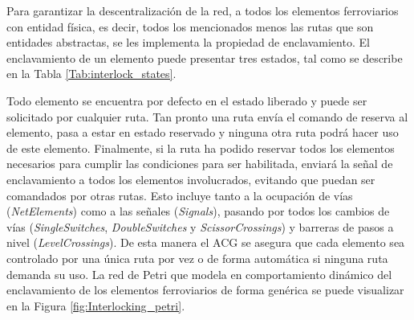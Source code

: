 Para garantizar la descentralización de la red, a todos los elementos ferroviarios con entidad física, es decir, todos los mencionados menos las rutas que son entidades abstractas, se les implementa la propiedad de enclavamiento. El enclavamiento de un elemento puede presentar tres estados, tal como se describe en la Tabla \ref{Tab:interlock_states}.

	\begin{table}[!h]
	{
		\caption{Estados de enclavamiento de cada elemento ferroviario.}
		\label{Tab:interlock_states}
		\centering
	}
	\end{table}

Todo elemento se encuentra por defecto en el estado liberado y puede ser solicitado por cualquier ruta. Tan pronto una ruta envía el comando de reserva al elemento, pasa a estar en estado reservado y ninguna otra ruta podrá hacer uso de este elemento. Finalmente, si la ruta ha podido reservar todos los elementos necesarios para cumplir las condiciones para ser habilitada, enviará la señal de enclavamiento a todos los elementos involucrados, evitando que puedan ser comandados por otras rutas. Esto incluye tanto a la ocupación de vías (\textit{NetElements}) como a las señales (\textit{Signals}), pasando por todos los cambios de vías (\textit{SingleSwitches}, \textit{DoubleSwitches} y \textit{ScissorCrossings}) y barreras de pasos a nivel (\textit{LevelCrossings}). De esta manera el ACG se asegura que cada elemento sea controlado por una única ruta por vez o de forma automática si ninguna ruta demanda su uso. La red de Petri que modela en comportamiento dinámico del enclavamiento de los elementos ferroviarios de forma genérica se puede visualizar en la Figura \ref{fig:Interlocking_petri}.

